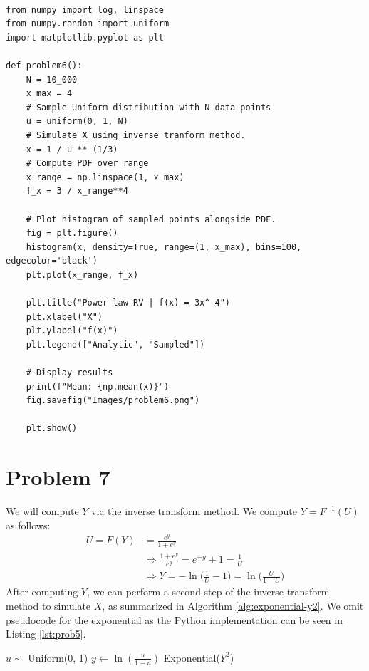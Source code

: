 \documentclass{homework}
\begin{document}
\begin{lstlisting}[caption=Problem 6 Code, label=lst:prob6]

from numpy import log, linspace
from numpy.random import uniform
import matplotlib.pyplot as plt

def problem6():
    N = 10_000
    x_max = 4
    # Sample Uniform distribution with N data points
    u = uniform(0, 1, N)
    # Simulate X using inverse tranform method.
    x = 1 / u ** (1/3)
    # Compute PDF over range
    x_range = np.linspace(1, x_max)
    f_x = 3 / x_range**4

    # Plot histogram of sampled points alongside PDF.
    fig = plt.figure()
    histogram(x, density=True, range=(1, x_max), bins=100, edgecolor='black')
    plt.plot(x_range, f_x)

    plt.title("Power-law RV | f(x) = 3x^-4")
    plt.xlabel("X")
    plt.ylabel("f(x)")
    plt.legend(["Analytic", "Sampled"])
    
    # Display results
    print(f"Mean: {np.mean(x)}")
    fig.savefig("Images/problem6.png")

    plt.show()
\end{lstlisting}

\section{Problem 7}

We will compute $Y$ via the inverse transform method. We compute $Y = F^{-1}(U)$
as follows:
\begin{align*}
    U = F(Y) &= \frac{e^y}{1 + e^y} \\
    &\Rightarrow \frac{1 + e^y}{e^y} = e^{-y} + 1 = \frac{1}{U} \\
    &\Rightarrow Y = -\ln \biggl(\frac{1}{U} - 1\biggr) = \ln\biggl(\frac{U}{1-U}\biggr)
\end{align*}
After computing $Y$, we can perform a second step of the inverse transform
method to simulate $X$, as summarized in Algorithm \ref{alg:exponential-y2}.
We omit pseudocode for the exponential as the Python implementation can be seen
in Listing \ref{lst:prob5}.

\begin{algorithm}
    \caption{Exponential with $\lambda=Y^2$}\label{alg:exponential-y2}
\begin{algorithmic}
    \State $u \sim$ Uniform(0, 1)
    \State $y \gets \ln(\frac{u}{1-u})$
    \State \Return Exponential($Y^2$)
\end{algorithmic}
\end{algorithm}
\end{document}
